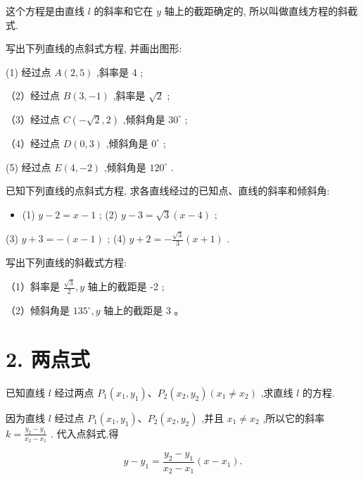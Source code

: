 \documentclass[lang=cn,newtx,10pt,scheme=chinese]{elegantbook}
\begin{document}
这个方程是由直线 \(l\) 的斜率和它在 \(y\) 轴上的截距确定的, 所以叫做直线方程的斜截式.

\begin{problemset}[练习]

\item 写出下列直线的点斜式方程, 并画出图形:

(1) 经过点 \(A\left( {2,5}\right)\) ,斜率是 4 ;

（2）经过点 \(B\left( {3, - 1}\right)\) ,斜率是 \(\sqrt{2}\) ;

（3）经过点 \(C\left( {-\sqrt{2},2}\right)\) ,倾斜角是 \({30}^{ \circ }\) ;

（4）经过点 \(D\left( {0,3}\right)\) ,倾斜角是 \({0}^{ \circ }\) ;

(5) 经过点 \(E\left( {4, - 2}\right)\) ,倾斜角是 \({120}^{ \circ }\) .

\item 已知下列直线的点斜式方程, 求各直线经过的已知点、直线的斜率和倾斜角:

\begin{itemize}
  \item (1) \(y - 2 = x - 1\) ; (2) \(y - 3 = \sqrt{3}\left( {x - 4}\right)\) ;
\end{itemize}

(3) \(y + 3 = - \left( {x - 1}\right)\) ; (4) \(y + 2 = - \frac{\sqrt{3}}{3}\left( {x + 1}\right)\) .

\item 写出下列直线的斜截式方程:

（1）斜率是 \(\frac{\sqrt{3}}{2},y\) 轴上的截距是 -2 ;

（2）倾斜角是 \({135}^{ \circ },y\) 轴上的截距是 3 。
\end{problemset}

\section*{2. 两点式}

已知直线 \(l\) 经过两点 \({P}_{1}\left( {{x}_{1},{y}_{1}}\right) \text{、}{P}_{2}\left( {{x}_{2},{y}_{2}}\right) \left( {{x}_{1} \neq {x}_{2}}\right)\) ,求直线 \(l\) 的方程.

因为直线 \(l\) 经过点 \({P}_{1}\left( {{x}_{1},{y}_{1}}\right) \text{、}{P}_{2}\left( {{x}_{2},{y}_{2}}\right)\) ,并且 \({x}_{1} \neq {x}_{2}\) ,所以它的斜率 \(k = \frac{{y}_{2} - {y}_{1}}{{x}_{2} - {x}_{1}}\) . 代入点斜式,得

\[
  y - {y}_{1} = \frac{{y}_{2} - {y}_{1}}{{x}_{2} - {x}_{1}}\left( {x - {x}_{1}}\right) .
\]
\end{document}
